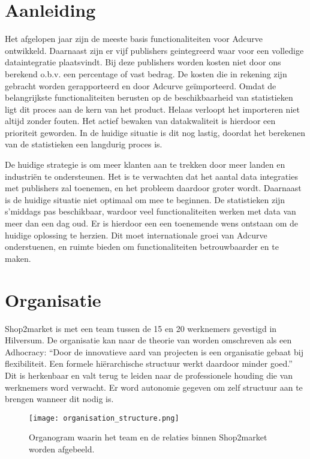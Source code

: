 \section{Aanleiding} %

Het afgelopen jaar zijn de meeste basis functionaliteiten voor Adcurve ontwikkeld. Daarnaast zijn er vijf publishers geintegreerd waar voor een volledige dataintegratie plaatsvindt. Bij deze publishers worden kosten niet door ons berekend o.b.v. een percentage of vast bedrag. De kosten die in rekening zijn gebracht worden gerapporteerd en door Adcurve geïmporteerd.
Omdat de belangrijkste functionaliteiten berusten op de beschikbaarheid van statistieken ligt dit proces aan de kern van het product. Helaas verloopt het importeren niet altijd zonder fouten. Het actief bewaken van datakwaliteit is hierdoor een prioriteit geworden. In de huidige situatie is dit nog lastig, doordat het berekenen van de statistieken een langdurig proces is.

De huidige strategie is om meer klanten aan te trekken door meer landen en industriën te ondersteunen. Het is te verwachten dat het aantal data integraties met publishers zal toenemen, en het probleem daardoor groter wordt. Daarnaast is de huidige situatie niet optimaal om mee te beginnen. De statistieken zijn s'middags pas beschikbaar, wardoor veel functionaliteiten werken met data van meer dan een dag oud. Er is hierdoor een een toenemende wens ontstaan om de huidige oplossing te herzien. Dit moet internationale groei van Adcurve onderstuenen, en ruimte bieden om functionaliteiten betrouwbaarder en te maken.

\section{Organisatie} %

Shop2market is met een team tussen de 15 en 20 werknemers gevestigd in Hilversum. De organisatie kan naar de theorie van
\autocite{mintzberg} worden omschreven als een Adhocracy: “Door de innovatieve aard van projecten is een organisatie gebaat bij flexibiliteit. Een formele hiërarchische structuur werkt daardoor minder goed.” Dit is herkenbaar en valt terug te leiden naar de professionele houding die van werknemers word verwacht. Er word autonomie gegeven om zelf structuur aan te brengen wanneer dit nodig is.

\begin{figure}[h]
    \texttt{[image: organisation\_structure.png]}
    \caption{Organogram waarin het team en de relaties binnen Shop2market worden afgebeeld.}
    \label{fig:orgchart}
\end{figure}

